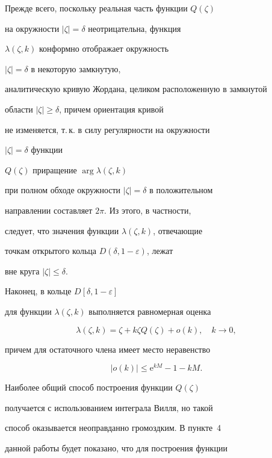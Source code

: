 Прежде всего, поскольку реальная часть функции $Q(\zeta)$


на окружности $|\zeta|=\delta$ неотрицательна, функция


$\lambda(\zeta,k)$ конформно отображает окружность


$|\zeta|=\delta$ в некоторую замкнутую,


аналитическую кривую Жордана, целиком расположенную в замкнутой 


области $|\zeta|\ge \delta$, причем ориентация кривой


не изменяется, т.\,к. в силу регулярности на окружности


$|\zeta|=\delta$ функции


$Q(\zeta)$ приращение $\arg\lambda(\zeta,k)$ 


при полном обходе окружности $|\zeta|=\delta$ в положительном 


направлении составляет $2\pi$. Из этого, в частности, 


следует, что значения функции $\lambda(\zeta,k)$,  отвечающие 


точкам открытого кольца $D(\delta,1-\varepsilon)$, лежат


вне круга $|\zeta|\le\delta$.


Наконец, в кольце $D[\delta,1-\varepsilon]$


для функции $\lambda(\zeta,k)$ выполняется равномерная оценка


\begin{equation}


\lambda(\zeta,k)=\zeta+k\zeta Q(\zeta)+o(k),\quad k\to 0,


\end{equation}


причем для остаточного члена имеет место неравенство


\begin{equation}


|o(k)|\le \mathrm e^{kM}-1-kM.


\end{equation}





Наиболее общий способ построения функции $Q(\zeta)$


получается с использованием интеграла Вилля, но такой 


способ оказывается неоправданно громоздким. В пункте~4 


данной работы  будет показано, что для построения функции


